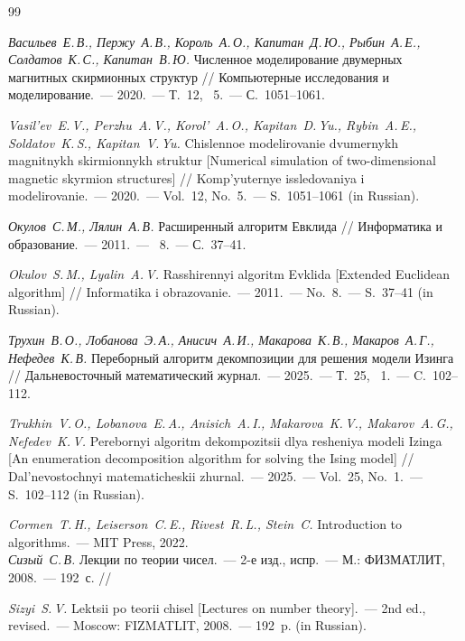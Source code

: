 \documentclass{crm-article}
\begin{document}
\begin{thebibliography}{99}

 {\it Васильев~Е.\,В., Пержу~А.\,В., Король~А.\,О., Капитан~Д.\,Ю., Рыбин~А.\,Е., Солдатов~К.\,С., Капитан~В.\,Ю.} Численное моделирование двумерных магнитных скирмионных структур // Компьютерные исследования и моделирование.~--- 2020.~--- Т.~12, \No~5.~--- С.~1051--1061.
\\
{\footnotesize{\it Vasil'ev~E.\,V., Perzhu~A.\,V., Korol'~A.\,O., Kapitan~D.\,Yu., Rybin~A.\,E., Soldatov~K.\,S., Kapitan~V.\,Yu.} Chislennoe modelirovanie dvumernykh magnitnykh skirmionnykh struktur [Numerical simulation of two-dimensional magnetic skyrmion structures] // Komp'yuternye issledovaniya i modelirovanie.~--- 2020.~--- Vol.~12, No.~5.~--- S.~1051--1061 (in Russian).\par}

 {\it Окулов~С.\,М., Лялин~А.\,В.} Расширенный алгоритм Евклида // Информатика и образование.~--- 2011.~--- \No~8.~--- С.~37--41.
\\
{\footnotesize{\it Okulov~S.\,M., Lyalin~A.\,V.} Rasshirennyi algoritm Evklida [Extended Euclidean algorithm] // Informatika i obrazovanie.~--- 2011.~--- No.~8.~--- S.~37--41 (in Russian).\par}

 {\it Трухин~В.\,О., Лобанова~Э.\,А., Анисич~А.\,И., Макарова~К.\,В., Макаров~А.\,Г., Нефедев~К.\,В.} Переборный алгоритм декомпозиции для решения модели Изинга // Дальневосточный математический журнал.~--- 2025.~--- Т.~25, \No~1.~--- C.~102--112.
\\
{\footnotesize{\it Trukhin~V.\,O., Lobanova~E.\,A., Anisich~A.\,I., Makarova~K.\,V., Makarov~A.\,G., Nefedev~K.\,V.} Perebornyi algoritm dekompozitsii dlya resheniya modeli Izinga [An enumeration decomposition algorithm for solving the Ising model] // Dal'nevostochnyi matematicheskii zhurnal.~--- 2025.~--- Vol.~25, No.~1.~--- S.~102--112 (in Russian).\par}

 {\it Cormen~T.\,H., Leiserson~C.\,E., Rivest~R.\,L., Stein~C.} Introduction to algorithms.~--- MIT Press, 2022.\\

{\it Сизый~С.\,В.} Лекции по теории чисел.~--- 2-е изд., испр.~--- М.: ФИЗМАТЛИТ, 2008.~--- 192~с. //
{\footnotesize{\it Sizyi~S.\,V.} Lektsii po teorii chisel [Lectures on number theory].~--- 2nd ed., revised.~--- Moscow: FIZMATLIT, 2008.~--- 192~p. (in Russian).\par}


\end{thebibliography}
\end{document}
